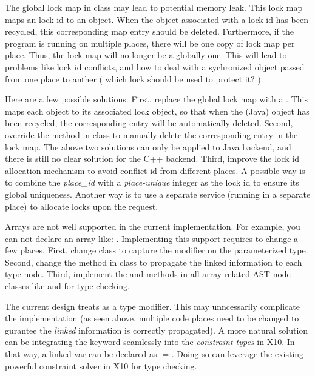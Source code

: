 \documentclass{article}
\begin{document}
\begin{enumerate}

\Item The global lock map  in class  may lead to potential memory leak. This lock map maps an  lock id to an  object. When the object associated with a lock id has been recycled, this corresponding map entry should be deleted. Furthermore, if the program is running on multiple places, there will be one copy of lock map per place. Thus, the lock map will no longer be a globally  one. This will lead to problems like lock id conflicts, and how to deal with a sychronized object passed from one place to anther ( which lock should be used to protect it? ).

Here are a few possible solutions. First, replace the global lock map with a . This  maps each object to its associated lock object, so that when the (Java) object has been recycled, the corresponding entry will be automatically deleted. Second, override the  method in class  to manually delete the corresponding entry in the lock map. The above two solutions can only be applied to Java backend, and there is still no clear solution for the C++ backend. Third, improve the lock id allocation mechanism to avoid conflict id from different places. A possible way is to combine the \textit{place\_id} with a \textit{place-unique} integer as the lock id to ensure its global uniqueness. Another way is to use a separate service (running in a separate place) to allocate locks upon the request.

\Item Arrays are not well supported in the current implementation. For example, you can not declare an array like:  . Implementing this support requires to change a few places.  First, change  class  to capture the  modifier on the parameterized type. Second, change the  method in class   to propagate the linked information to each type node. Third, implement the  and  methods in all array-related AST node classes like  and  for type-checking.

\Item  The current design treats  as a type modifier. This may unncessarily complicate the implementation (as seen above, multiple code places need to be changed to gurantee the \textit{linked} information is correctly propagated). A more natural solution can be integrating the  keyword seamlessly into the \textit{constraint types} in X10. In that way, a linked var can be declared as:  = . Doing so can leverage the existing powerful constraint solver in X10 for type checking.


\end{enumerate}
\end{document}
